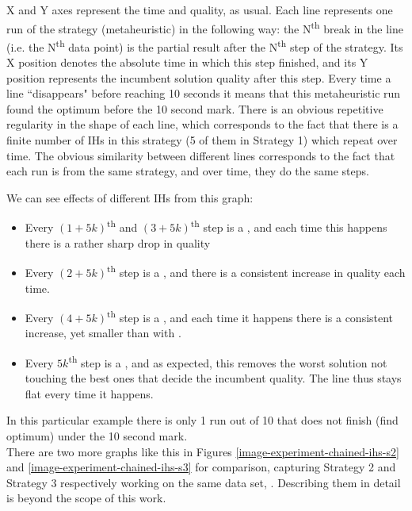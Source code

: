 X and Y axes represent the time and quality, as usual. Each line represents one run of the strategy (metaheuristic) in the following way: the N\textsuperscript{th} break in the line (i.e. the N\textsuperscript{th} data point) is the partial result after the N\textsuperscript{th} step of the strategy. Its X position denotes the absolute time in which this step finished, and its Y position represents the incumbent solution quality after this step. Every time a line ``disappears" before reaching 10 seconds it means that this metaheuristic run found the optimum before the 10 second mark. There is an obvious repetitive regularity in the shape of each line, which corresponds to the fact that there is a finite number of IHs in this strategy (5 of them in Strategy 1) which repeat over time. The obvious similarity between different lines corresponds to the fact that each run is from the same strategy, and over time, they do the same steps.

We can see effects of different IHs from this graph:
\begin{itemize}
	\item Every $(1 + 5k)$\textsuperscript{th} and $(3 + 5k)$\textsuperscript{th} step is a , and each time this happens there is a rather sharp drop in quality
	\item Every $(2 + 5k)$\textsuperscript{th} step is a , and there is a consistent increase in quality each time.
	\item Every $(4 + 5k)$\textsuperscript{th} step is a , and each time it happens there is a consistent increase, yet smaller than with .
	\item Every $5k$\textsuperscript{th} step is a , and as expected, this removes the worst solution not touching the best ones that decide the incumbent quality. The line thus stays flat every time it happens.
\end{itemize}

In this particular example there is only 1 run out of 10 that does not finish (find optimum) under the 10 second mark.\\

There are two more graphs like this in Figures \ref{image-experiment-chained-ihs-s2} and \ref{image-experiment-chained-ihs-s3} for comparison, capturing Strategy 2 and Strategy 3 respectively working on the same data set, . Describing them in detail is beyond the scope of this work.\\

